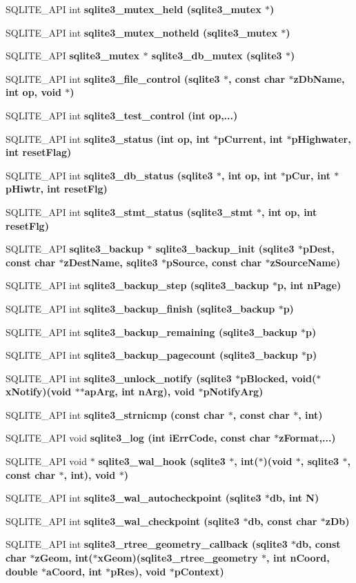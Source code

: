 \begin{CompactItemize}
\item 
SQLITE\_\-API int \bf{sqlite3\_\-mutex\_\-held} (\bf{sqlite3\_\-mutex} $\ast$)
\item 
SQLITE\_\-API int \bf{sqlite3\_\-mutex\_\-notheld} (\bf{sqlite3\_\-mutex} $\ast$)
\item 
SQLITE\_\-API \bf{sqlite3\_\-mutex} $\ast$ \bf{sqlite3\_\-db\_\-mutex} (\bf{sqlite3} $\ast$)
\item 
SQLITE\_\-API int \bf{sqlite3\_\-file\_\-control} (\bf{sqlite3} $\ast$, const char $\ast$z\-Db\-Name, int op, void $\ast$)
\item 
SQLITE\_\-API int \bf{sqlite3\_\-test\_\-control} (int op,...)
\item 
SQLITE\_\-API int \bf{sqlite3\_\-status} (int op, int $\ast$p\-Current, int $\ast$p\-Highwater, int reset\-Flag)
\item 
SQLITE\_\-API int \bf{sqlite3\_\-db\_\-status} (\bf{sqlite3} $\ast$, int op, int $\ast$p\-Cur, int $\ast$p\-Hiwtr, int reset\-Flg)
\item 
SQLITE\_\-API int \bf{sqlite3\_\-stmt\_\-status} (\bf{sqlite3\_\-stmt} $\ast$, int op, int reset\-Flg)
\item 
SQLITE\_\-API \bf{sqlite3\_\-backup} $\ast$ \bf{sqlite3\_\-backup\_\-init} (\bf{sqlite3} $\ast$p\-Dest, const char $\ast$z\-Dest\-Name, \bf{sqlite3} $\ast$p\-Source, const char $\ast$z\-Source\-Name)
\item 
SQLITE\_\-API int \bf{sqlite3\_\-backup\_\-step} (\bf{sqlite3\_\-backup} $\ast$p, int n\-Page)
\item 
SQLITE\_\-API int \bf{sqlite3\_\-backup\_\-finish} (\bf{sqlite3\_\-backup} $\ast$p)
\item 
SQLITE\_\-API int \bf{sqlite3\_\-backup\_\-remaining} (\bf{sqlite3\_\-backup} $\ast$p)
\item 
SQLITE\_\-API int \bf{sqlite3\_\-backup\_\-pagecount} (\bf{sqlite3\_\-backup} $\ast$p)
\item 
SQLITE\_\-API int \bf{sqlite3\_\-unlock\_\-notify} (\bf{sqlite3} $\ast$p\-Blocked, void($\ast$x\-Notify)(void $\ast$$\ast$ap\-Arg, int n\-Arg), void $\ast$p\-Notify\-Arg)
\item 
SQLITE\_\-API int \bf{sqlite3\_\-strnicmp} (const char $\ast$, const char $\ast$, int)
\item 
SQLITE\_\-API void \bf{sqlite3\_\-log} (int i\-Err\-Code, const char $\ast$z\-Format,...)
\item 
SQLITE\_\-API void $\ast$ \bf{sqlite3\_\-wal\_\-hook} (\bf{sqlite3} $\ast$, int($\ast$)(void $\ast$, \bf{sqlite3} $\ast$, const char $\ast$, int), void $\ast$)
\item 
SQLITE\_\-API int \bf{sqlite3\_\-wal\_\-autocheckpoint} (\bf{sqlite3} $\ast$\bf{db}, int N)
\item 
SQLITE\_\-API int \bf{sqlite3\_\-wal\_\-checkpoint} (\bf{sqlite3} $\ast$\bf{db}, const char $\ast$z\-Db)
\item 
SQLITE\_\-API int \bf{sqlite3\_\-rtree\_\-geometry\_\-callback} (\bf{sqlite3} $\ast$\bf{db}, const char $\ast$z\-Geom, int($\ast$x\-Geom)(\bf{sqlite3\_\-rtree\_\-geometry} $\ast$, int n\-Coord, double $\ast$a\-Coord, int $\ast$p\-Res), void $\ast$p\-Context)
\end{CompactItemize}
